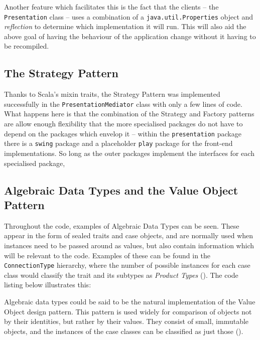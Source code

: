 Another feature which facilitates this is the fact that the clients -- the
\texttt{Presentation} class -- uses a combination of a
\texttt{java.util.Properties} object and \emph{reflection} to determine which
implementation it will run. This will also aid the above goal of having the
behaviour of the application change without it having to be recompiled.


\subsection{The Strategy Pattern} \label{sec:Implementation.TheStrategyPattern}

Thanks to Scala's mixin traits, the Strategy Pattern was implemented
successfully in the \texttt{PresentationMediator} class with only a few lines
of code. What happens here is that the combination of the Strategy and Factory
patterns are allow enough flexibility that the more specialised packages do not
have to depend on the packages which envelop it -- within the
\texttt{presentation} package there is a \texttt{swing} package and a
placeholder \texttt{play} package for the front-end implementations. So long as
the outer packages implement the interfaces for each specialised package, 

\subsection{Algebraic Data Types and the Value Object Pattern} \label{sec:Implementation.ADTAndValueObject}

Throughout the code, examples of Algebraic Data Types can be seen. These appear
in the form of sealed traits and case objects, and are normally used when
instances need to be passed around as values, but also contain information
which will be relevant to the code. Examples of these can be found in the
\texttt{ConnectionType} hierarchy, where the number of possible instances for
each case class would classify the trait and its subtypes as \emph{Product
Types} (\cite[][p.~411]{wampler2015programming}). The code listing below
illustrates this:

{
  \small
  
}

Algebraic data types could be said to be the natural implementation of the
Value Object design pattern. This pattern is used widely for comparison of
objects not by their identities, but rather by their values. They consist of
small, immutable objects, and the instances of the case classes can be
classified as just those (\cite[][Ch.~8,~Location~3068]{nikolov2016scala}).

